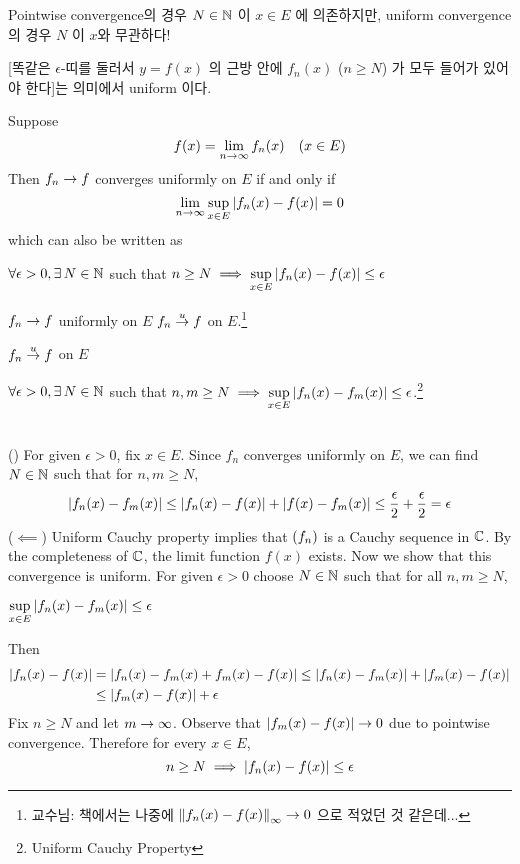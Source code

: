 Pointwise convergence의 경우 \(N \in \mathbb{N}\) 이 \(x \in E\) 에 의존하지만, uniform convergence의 경우 \(N\) 이 \(x\)와 무관하다!

[똑같은 \(\epsilon\)-띠를 둘러서 \(y = f(x)\) 의 근방 안에 \(f_n(x)\) (\(n \geq N\)) 가 모두 들어가 있어야 한다]는 의미에서 uniform 이다.

 Suppose
\[
    f(x) = \lim_{n \rightarrow \infty} f_n(x) \quad (x \in E)
\]
Then \(f_n \rightarrow f\) converges uniformly on \(E\) if and only if
\[
    \lim_{n \rightarrow \infty} \sup_{x \in E} \left| f_n(x) - f(x) \right| = 0
\]
which can also be written as
\begin{center}
    \(\forall \epsilon > 0, \exists N\in \N\) such that \(\displaystyle n \geq N \implies \sup_{x \in E} \left| f_n(x) - f(x) \right| \leq \epsilon\)
\end{center}

\notation \(f_n \rightarrow f\) uniformly on \(E\) \miff \(f_n \overset{u}{\rightarrow} f\) on \(E\).\footnote{교수님: 책에서는 나중에 \(\left\lVert f_n(x) - f(x) \right\rVert_\infty \rightarrow 0\) 으로 적었던 것 같은데...}

 
\(f_n \overset{u}{\rightarrow} f\) on \(E\) \miff
\begin{center}
    \(\forall \epsilon > 0, \exists N \in \N\) such that \(n, m \geq N \implies \displaystyle \sup_{x \in E} \left| f_n(x) - f_m(x) \right| \leq \epsilon\).\footnote{Uniform Cauchy Property}
\end{center}

\pf\\
(\mimp) For given \(\epsilon > 0\), fix \(x \in E\). Since \(f_n\) converges uniformly on \(E\), we can find \(N \in \mathbb{N}\) such that for \(n, m \geq N\),
\[
    \left| f_n(x) - f_m(x) \right| \leq \left| f_n(x) - f(x) \right| + \left| f(x) - f_m(x) \right| \leq \frac{\epsilon}{2} + \frac{\epsilon}{2} = \epsilon
\]
(\(\impliedby\)) Uniform Cauchy property implies that \(\left( f_n \right)\) is a Cauchy sequence in \(\mathbb{C}\). By the completeness of \(\mathbb{C}\), the limit function \(f(x)\) exists. Now we show that this convergence is uniform.
For given \(\epsilon > 0\) choose \(N \in \mathbb{N}\) such that for all \(n, m \geq N\),
\begin{center}
    \(\displaystyle \sup_{x \in E} \left| f_n(x) - f_m(x) \right| \leq \epsilon\)
\end{center}
Then
\[
    \begin{aligned}
        \left| f_n(x) - f(x) \right| &= \left| f_n(x) - f_m(x) + f_m(x) - f(x) \right| \leq \left| f_n(x) - f_m(x) \right| + \left| f_m(x) - f(x) \right|\\
        &\leq \left| f_m(x) - f(x) \right| + \epsilon
    \end{aligned}
\]
Fix \(n \geq N\) and let \(m \rightarrow \infty\). Observe that \(\left| f_m(x) - f(x) \right| \rightarrow 0\) due to pointwise convergence. Therefore for every \(x \in E\),
\[
    n \geq N \implies \left| f_n(x) - f(x) \right| \leq \epsilon
\]

\pagebreak
